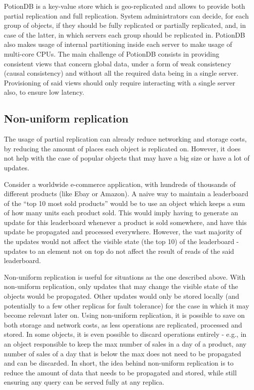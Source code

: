 
PotionDB is a key-value store which is geo-replicated and allows to provide both partial replication and full replication.
System administrators can decide, for each group of objects, if they should be fully replicated or partially replicated, and, in case of the latter, in which servers each group should be replicated in.
PotionDB also makes usage of internal partitioning inside each server to make usage of multi-core CPUs.
The main challenge of PotionDB consists in providing consistent views that concern global data, under a form of weak consistency (causal consistency) and without all the required data being in a single server.
Provisioning of said views should only require interacting with a single server also, to ensure low latency.

\subsection{Non-uniform replication}

The usage of partial replication can already reduce networking and storage costs, by reducing the amount of places each object is replicated on.
However, it does not help with the case of popular objects that may have a big size or have a lot of updates.

Consider a worldwide e-commerce application, with hundreds of thousands of different products (like Ebay or Amazon).
A naive way to maintain a leaderboard of the ``top 10 most sold products'' would be to use an object which keeps a sum of how many units each product sold.
This would imply having to generate an update for this leaderboard whenever a product is sold somewhere, and have this update be propagated and processed everywhere.
However, the vast majority of the updates would not affect the visible state (the top 10) of the leaderboard - updates to an element not on top do not affect the result of reads of the said leaderboard.

Non-uniform replication \cite{nonUniform} is useful for situations as the one described above.
With non-uniform replication, only updates that may change the visible state of the objects would be propagated.
Other updates would only be stored locally (and potentially to a few other replicas for fault tolerance) for the case in which it may become relevant later on.
Using non-uniform replication, it is possible to save on both storage and network costs, as less operations are replicated, processed and stored.
In some objects, it is even possible to discard operations entirely \cite{nonUniform} - e.g., in an object responsible to keep the max number of sales in a day of a product, any number of sales of a day that is below the max does not need to be propagated and can be discarded.
In short, the idea behind non-uniform replication is to reduce the amount of data that needs to be propagated and stored, while still ensuring any query can be served fully at any replica.

